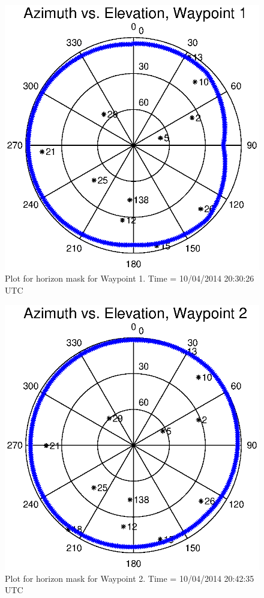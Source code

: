\documentclass[]{aiaa-tc}%
\begin{document}
	\begin{figure}[H]
		\centering
		\includegraphics[width = 13cm]{AzElWaypoint1.eps}
		\caption{Plot for horizon mask for Waypoint 1. Time = 10/04/2014 20:30:26 UTC}
		\label{fig:AzElWaypoint1}
	\end{figure}
		
	\begin{figure}[H]
		\centering
		\includegraphics[width = 13cm]{AzElWaypoint2.eps}
		\caption{Plot for horizon mask for Waypoint 2. Time = 10/04/2014 20:42:35 UTC}
		\label{fig:AzElWaypoint2}
	\end{figure}
	
\end{document}
